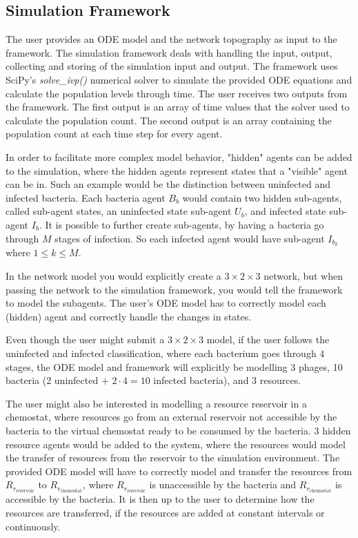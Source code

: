 \subsection{Simulation Framework}
\label{sec:simulation_framework}
The user provides an ODE model and the network topography as input to the framework. 
The simulation framework deals with handling the input, output, collecting and storing of the simulation input and output.
The framework uses SciPy's \cite{virtanenSciPy10Fundamental2020} \textit{solve\_ivp()} numerical solver \cite{ dormandFamilyEmbeddedRungeKutta1980} to simulate the provided ODE equations and calculate the population levels through time.
The user receives two outputs from the framework. 
The first output is an array of time values that the solver used to calculate the population count.
The second output is an array containing the population count at each time step for every agent.

In order to facilitate more complex model behavior, "hidden" agents can be added to the simulation, where the hidden agents represent states that a "visible" agent can be in. 
Such an example would be the distinction between uninfected and infected bacteria. 
Each bacteria agent $B_b$ would contain two hidden sub-agents, called sub-agent states, an uninfected state sub-agent $U_b$, and infected state sub-agent $I_b$. 
It is possible to further create sub-agents, by having a bacteria go through $M$ stages of infection. 
So each infected agent would have sub-agent $I_{b_k}$ where $1 \leq k \leq M$. 

In the network model you would explicitly create a $3\times 2 \times 3$ network, but when passing the network to the simulation framework, you would tell the framework to model the subagents. 
The user's ODE model has to correctly model each (hidden) agent and correctly handle the changes in states. 

Even though the user might submit a $3 \times 2 \times 3$ model, if the user follows the uninfected and infected classification, where each bacterium goes through $4$ stages, the ODE model and framework will explicitly be modelling 3 phages, 10 bacteria (2 uninfected + $2\cdot 4=10$ infected bacteria), and 3 resources. 

The user might also be interested in modelling a resource reservoir in a chemostat, where resources go from an external reservoir not accessible by the bacteria to the virtual chemostat ready to be consumed by the bacteria. 
3 hidden resource agents would be added to the system, where the resources would model the transfer of resources from the reservoir to the simulation environment. 
The provided ODE model will have to correctly model and transfer the resources from $R_{r_{\text{reservoir}}}$ to $R_{r_{\text{chemostat}}}$, where $R_{r_{\text{reservoir}}}$ is unaccessible by the bacteria and $R_{r_{\text{chemostat}}}$ is accessible by the bacteria. 
It is then up to the user to determine how the resources are transferred, if the resources are added at constant intervals or continuously. 

